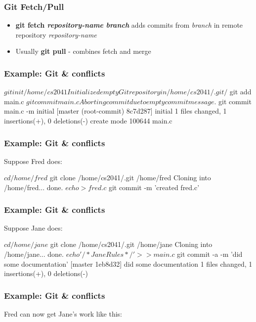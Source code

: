 \begin{frame}
\frametitle{Git Fetch/Pull}

\begin{itemize}
\item {\bf git fetch {\it repository-name} {\it branch}} adds commits from {\it branch} in remote repository {\it repository-name} 

\item Usually  {\bf git pull} - combines fetch and merge
\end{itemize}
\end{frame}

\begin{frame}[fragile]
\frametitle{Example: Git \& conflicts}

\begin{sh}
$ git init /home/cs2041
Initialized empty Git repository in /home/cs2041/.git/
$ git add main.c 
$ git commit main.c 
Aborting commit due to empty commit message.
$ git commit main.c -m initial
[master (root-commit) 8c7d287] initial
 1 files changed, 1 insertions(+), 0 deletions(-)
 create mode 100644 main.c
\end{sh}
\end{frame}

\begin{frame}[fragile]
\frametitle{Example: Git \& conflicts}
 
Suppose Fred does:

\begin{sh}
$ cd /home/fred
$ git clone /home/cs2041/.git /home/fred
Cloning into /home/fred...
done.
$ echo >fred.c
$ git commit -m 'created fred.c'
\end{sh}
\end{frame}

\begin{frame}[fragile]
\frametitle{Example: Git \& conflicts}
 
Suppose Jane does: 
\begin{sh}
$ cd /home/jane
$ git clone /home/cs2041/.git /home/jane
Cloning into /home/jane...
done.
$ echo '/* Jane Rules */' >>main.c
$ git commit -a  -m 'did some documentation'
[master 1eb8d32] did some documentation
 1 files changed, 1 insertions(+), 0 deletions(-)
\end{sh}
\end{frame}

\begin{frame}[fragile]
\frametitle{Example: Git \& conflicts}
 
Fred can now get Jane's work like this:

\end{frame}

